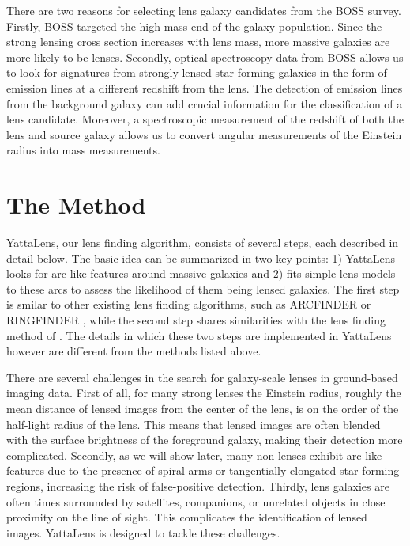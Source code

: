 \documentclass[a4paper,fleqn,usenatbib]{mnras}
\begin{document}
There are two reasons for selecting lens galaxy candidates from the BOSS survey. Firstly, BOSS targeted the high mass end of the galaxy population. Since the strong lensing cross section increases with lens mass, more massive galaxies are more likely to be lenses.
Secondly, optical spectroscopy data from BOSS allows us to look for signatures from strongly lensed star forming galaxies in the form of emission lines at a different redshift from the lens.
The detection of emission lines from the background galaxy can add crucial information for the classification of a lens candidate. Moreover, a spectroscopic measurement of the redshift of both the lens and source galaxy allows us to convert angular measurements of the Einstein radius into mass measurements.

\section{The Method}

YattaLens, our lens finding algorithm, consists of several steps, each described in detail below.
The basic idea can be summarized in two key points: 1) YattaLens looks for arc-like features around massive galaxies and 2) fits simple lens models to these arcs to assess the likelihood of them being lensed galaxies.
The first step is smilar to other existing lens finding algorithms, such as ARCFINDER \citep{Ala06, Mor++12} or RINGFINDER \citep{Gav++14}, while the second step shares similarities with the lens finding method of \citet{Mar++09}.
The details in which these two steps are implemented in YattaLens however are different from the methods listed above.

There are several challenges in the search for galaxy-scale lenses in ground-based imaging data.
First of all, for many strong lenses the Einstein radius, roughly the mean distance of lensed images from the center of the lens, is on the order of the half-light radius of the lens. This means that lensed images are often blended with the surface brightness of the foreground galaxy, making their detection more complicated.
Secondly, as we will show later, many non-lenses exhibit arc-like features due to the presence of spiral arms or tangentially elongated star forming regions,  increasing the risk of false-positive detection.
Thirdly, lens galaxies are often times surrounded by satellites, companions, or unrelated objects in close proximity on the line of sight. This complicates the identification of lensed images.
YattaLens is designed to tackle these challenges.
\end{document}
